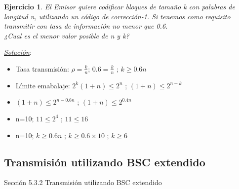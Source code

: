 \documentclass{beamer}
\theoremstyle{plain}
\theoremstyle{example}
\newtheorem{ejercicio} [Ejercicio]{Ejercicio}
\theoremstyle{example}
\begin{document}
\begin{frame}  \small \begin{ejercicio}

El Emisor quiere codificar bloques de tamaño k con palabras de longitud n, utilizando un código de corrección-1. Si tenemos como requisito transmitir con tasa de información no menor que 0.6. \\
\vspace{0.3cm}
¿Cual es el menor valor posible de n y k?
 \end{ejercicio}  \textit{\underline{Solución}}:\\ 
\vspace{0.3cm}

\begin{itemize}
\item Tasa transmisión: $\rho = \frac{k}{n}$; $0.6 = \frac{k}{n}$ ; $k \geq 0.6 n$
\item Límite emabalaje: $2^k(1 + n) \leq 2^n$ ; $(1 + n) \leq 2^{n-k}$

\item $(1 + n) \leq 2^{n- 0.6 n}$ ; $(1 + n) \leq 2^{0.4 n}$

\item n=10; $ 11 \leq 2^{4} $ ; $11 \leq 16$
\item n=10; $k \geq 0.6 n$ ; $k \geq 0.6 \times 10$ ; $k \geq  6 $
\end{itemize} 




 \end{frame} 









\subsection{Transmisión utilizando BSC extendido}
\begin{frame}   \footnotesize
{
\begin{block}{Sección 5.3.2}
Transmisión utilizando BSC extendido
\end{block}
}
\end{frame}
\end{document}
